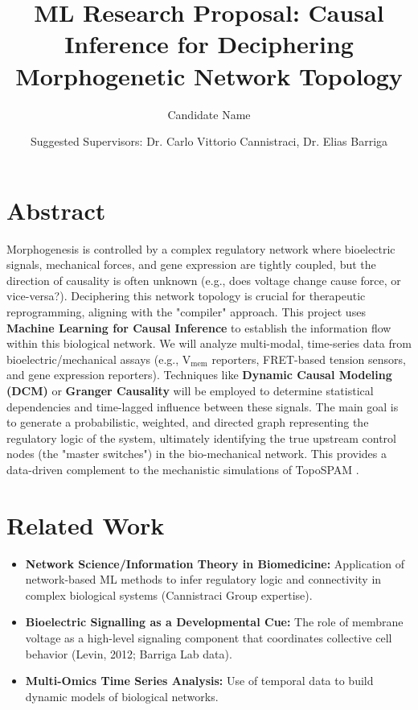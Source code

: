 \documentclass{article}
\title{ML Research Proposal: Causal Inference for Deciphering Morphogenetic Network Topology}
\author{Candidate Name}
\date{Suggested Supervisors: Dr. Carlo Vittorio Cannistraci, Dr. Elias Barriga}
\begin{document}
\maketitle

\section*{Abstract}
Morphogenesis is controlled by a complex regulatory network where bioelectric signals, mechanical forces, and gene expression are tightly coupled, but the direction of causality is often unknown (e.g., does voltage change cause force, or vice-versa?). Deciphering this network topology is crucial for therapeutic reprogramming, aligning with the "compiler" approach. This project uses \textbf{Machine Learning for Causal Inference} to establish the information flow within this biological network. We will analyze multi-modal, time-series data from bioelectric/mechanical assays (e.g., $\text{V}_{\text{mem}}$ reporters, FRET-based tension sensors, and gene expression reporters). Techniques like \textbf{Dynamic Causal Modeling (DCM)} or \textbf{Granger Causality} will be employed to determine statistical dependencies and time-lagged influence between these signals. The main goal is to generate a probabilistic, weighted, and directed graph representing the regulatory logic of the system, ultimately identifying the true upstream control nodes (the "master switches") in the bio-mechanical network. This provides a data-driven complement to the mechanistic simulations of TopoSPAM \cite{1}.

\section*{Related Work}
\begin{itemize}
    \item \textbf{Network Science/Information Theory in Biomedicine:} Application of network-based ML methods to infer regulatory logic and connectivity in complex biological systems (Cannistraci Group expertise).
    \item \textbf{Bioelectric Signalling as a Developmental Cue:} The role of membrane voltage as a high-level signaling component that coordinates collective cell behavior (Levin, 2012; Barriga Lab data).
    \item \textbf{Multi-Omics Time Series Analysis:} Use of temporal data to build dynamic models of biological networks.
\end{itemize}
\end{document}
